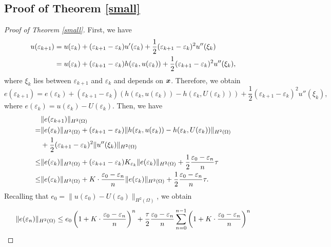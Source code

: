 \subsection{Proof of Theorem \ref{small}}
\begin{proof}[Proof of Theorem \ref{small}]
    First, we have  
    \begin{align}
        u(\varepsilon_{k+1}) &= u(\varepsilon_k) + (\varepsilon_{k+1}-\varepsilon_k)u'(\varepsilon_k) + \frac{1}{2}(\varepsilon_{k+1}-\varepsilon_k)^2u''(\xi_k) \notag \\
        &= u(\varepsilon_k) + (\varepsilon_{k+1}-\varepsilon_k)h(\varepsilon_k,u(\varepsilon_k)) + \frac{1}{2}(\varepsilon_{k+1}-\varepsilon_k)^2u''(\xi_k),
    \end{align}
    where \( \xi_k \) lies between \( \varepsilon_{k+1} \) and \( \varepsilon_k \) and depends on \( \boldsymbol{x} \). Therefore, we obtain  
    \begin{equation}
        e(\varepsilon_{k+1}) = e(\varepsilon_k) + (\varepsilon_{k+1}-\varepsilon_k)(h(\varepsilon_k,u(\varepsilon_k)) - h(\varepsilon_k,U(\varepsilon_k))) + \frac{1}{2}(\varepsilon_{k+1}-\varepsilon_k)^2u''(\xi_k),
    \end{equation}
    where \( e(\varepsilon_k) = u(\varepsilon_k) - U(\varepsilon_k) \). Then, we have  
    \begin{align}
     &\|e(\varepsilon_{k+1})\|_{H^2(\Omega)} \notag \\
     =&\|e(\varepsilon_k)\|_{H^2(\Omega)} + (\varepsilon_{k+1}-\varepsilon_k)\|h(\varepsilon_k,u(\varepsilon_k)) - h(\varepsilon_k,U(\varepsilon_k))\|_{H^2(\Omega)} \notag \\
     &+ \frac{1}{2}(\varepsilon_{k+1}-\varepsilon_k)^2\|u''(\xi_k)\|_{H^2(\Omega)} \notag \\
     \leq& \|e(\varepsilon_k)\|_{H^2(\Omega)} + (\varepsilon_{k+1}-\varepsilon_k)K_{\varepsilon_k}\|e(\varepsilon_k)\|_{H^2(\Omega)} + \frac{1}{2} \frac{\varepsilon_0-\varepsilon_n}{n} \tau \notag \\
     \leq& \|e(\varepsilon_k)\|_{H^2(\Omega)} + K \cdot \frac{\varepsilon_0-\varepsilon_n}{n} \|e(\varepsilon_k)\|_{H^2(\Omega)} + \frac{1}{2} \frac{\varepsilon_0-\varepsilon_n}{n} \tau.
    \end{align}
    Recalling that \( e_0 = \|u (\varepsilon_0)-U(\varepsilon_0)\|_{H^2(\Omega)}\), we obtain  
    \begin{align}
    \|e(\varepsilon_{n})\|_{H^2(\Omega)} 
        &\leq e_0\left(1+K\cdot \frac{\varepsilon_0-\varepsilon_n}{n}\right)^n+\frac{\tau}{2} \frac{\varepsilon_0-\varepsilon_n}{n} \sum_{n=0}^{n-1} \left(1+K\cdot \frac{\varepsilon_0-\varepsilon_n}{n}\right)^n \notag \\

\end{align}
\end{proof}
